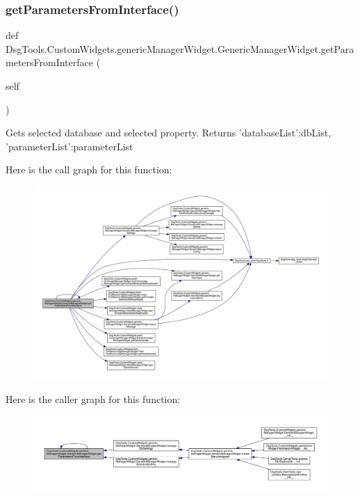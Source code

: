 \subsubsection{\texorpdfstring{get\+Parameters\+From\+Interface()}{getParametersFromInterface()}}
{\footnotesize\ttfamily def Dsg\+Tools.\+Custom\+Widgets.\+generic\+Manager\+Widget.\+Generic\+Manager\+Widget.\+get\+Parameters\+From\+Interface (\begin{DoxyParamCaption}\item[{}]{self }\end{DoxyParamCaption})}

\begin{DoxyVerb}Gets selected database and selected property. 
Returns {'databaseList':dbList, 'parameterList':parameterList}
\end{DoxyVerb}
 Here is the call graph for this function\+:
\nopagebreak
\begin{figure}[H]
\begin{center}
\leavevmode
\includegraphics[width=350pt]{class_dsg_tools_1_1_custom_widgets_1_1generic_manager_widget_1_1_generic_manager_widget_a18683865cebe8c6817089f211b2c112d_cgraph}
\end{center}
\end{figure}
Here is the caller graph for this function\+:
\nopagebreak
\begin{figure}[H]
\begin{center}
\leavevmode
\includegraphics[width=350pt]{class_dsg_tools_1_1_custom_widgets_1_1generic_manager_widget_1_1_generic_manager_widget_a18683865cebe8c6817089f211b2c112d_icgraph}
\end{center}
\end{figure}
